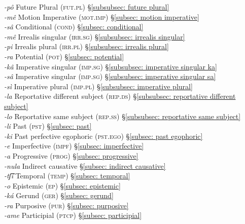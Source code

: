 \begin{tabbing}
\textit{-pô} \> Future Plural (\textsc{fut.pl}) \> §\ref{subsubsec: future plural}\\
\textit{-mê} \> Motion Imperative (\textsc{mot.imp}) \> §\ref{subsec: motion imperative}\\
\textit{-sâ} \> Conditional (\textsc{cond}) \> §\ref{subsec: conditional}\\
\textit{-mê} \> Irrealis singular (\textsc{irr.sg}) \> §\ref{subsubsec: irrealis singular}\\
\textit{-pi} \> Irrealis plural (\textsc{irr.pl}) \> §\ref{subsubsec: irrealis plural}\\
\textit{-ra} \> Potential (\textsc{pot}) \> §\ref{subsec: potential}\\
\textit{-kâ} \> Imperative singular (\textsc{imp.sg})  \> §\ref{subsubsec: imperative singular ka}\\
\textit{-sâ} \> Imperative singular (\textsc{imp.sg})  \> §\ref{subsubsec: imperative singular sa}\\
\textit{-sì} \> Imperative plural (\textsc{imp.pl}) \> §\ref{subsubsec: imperative plural}\\
\textit{-la} \> Reportative different subject (\textsc{rep.ds}) \> §\ref{subsubsec: reportative different subject}\\
\textit{-lo} \> {Reportative same subject (\textsc{rep.ss})} \> §\ref{subsubsec: reportative same subject}\\
\textit{-li} \> Past (\textsc{pst}) \>  §\ref{subsec: past}\\
\textit{-ki} \> Past perfective egophoric (\textsc{pst.ego}) \> §\ref{subsec: past egophoric}\\
\textit{-e} \> Imperfective (\textsc{impf}) \> §\ref{subsec: imperfective}\\
\textit{-a}  \> Progressive (\textsc{prog}) \> §\ref{subsec: progressive}\\
\textit{-nula} \> Indirect causative  \> §\ref{subsec: indirect causative}\\
\textit{-tʃ͡i} \> Temporal (\textsc{temp}) \> §\ref{subsec: temporal}\\
\textit{-o} \> Epistemic (\textsc{ep}) \> §\ref{subsec: epistemic}\\
\textit{-ká} \> Gerund (\textsc{ger}) \> §\ref{subsec: gerund}\\
\textit{-ra} \> Purposive (\textsc{pur}) \> §\ref{subsec: purposive}\\
\textit{-ame} \> Participial (\textsc{ptcp}) \> §\ref{subsec: participial}\\
\end{tabbing}

